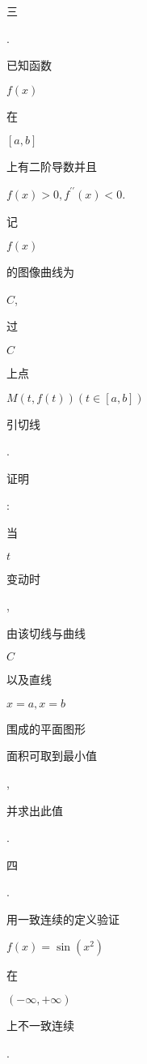 \documentclass[10pt]{article}
\begin{document}
\begin{CJK}{UTF8}{mj}三\end{CJK}. \begin{CJK}{UTF8}{mj}已知函数\end{CJK} $f(x)$ \begin{CJK}{UTF8}{mj}在\end{CJK} $[a, b]$ \begin{CJK}{UTF8}{mj}上有二阶导数并且\end{CJK} $f(x)>0, f^{\prime \prime}(x)<0$. \begin{CJK}{UTF8}{mj}记\end{CJK} $f(x)$ \begin{CJK}{UTF8}{mj}的图像曲线为\end{CJK} $C$, \begin{CJK}{UTF8}{mj}过\end{CJK} $C$ \begin{CJK}{UTF8}{mj}上点\end{CJK} $M(t, f(t))(t \in[a, b])$ \begin{CJK}{UTF8}{mj}引切线\end{CJK}. \begin{CJK}{UTF8}{mj}证明\end{CJK}: \begin{CJK}{UTF8}{mj}当\end{CJK} $t$ \begin{CJK}{UTF8}{mj}变动时\end{CJK}, \begin{CJK}{UTF8}{mj}由该切线与曲线\end{CJK} $C$ \begin{CJK}{UTF8}{mj}以及直线\end{CJK} $x=a, x=b$ \begin{CJK}{UTF8}{mj}围成的平面图形\end{CJK} \begin{CJK}{UTF8}{mj}面积可取到最小值\end{CJK}, \begin{CJK}{UTF8}{mj}并求出此值\end{CJK}.

\begin{CJK}{UTF8}{mj}四\end{CJK}. \begin{CJK}{UTF8}{mj}用一致连续的定义验证\end{CJK} $f(x)=\sin \left(x^{2}\right)$ \begin{CJK}{UTF8}{mj}在\end{CJK} $(-\infty,+\infty)$ \begin{CJK}{UTF8}{mj}上不一致连续\end{CJK}.
\end{document}
